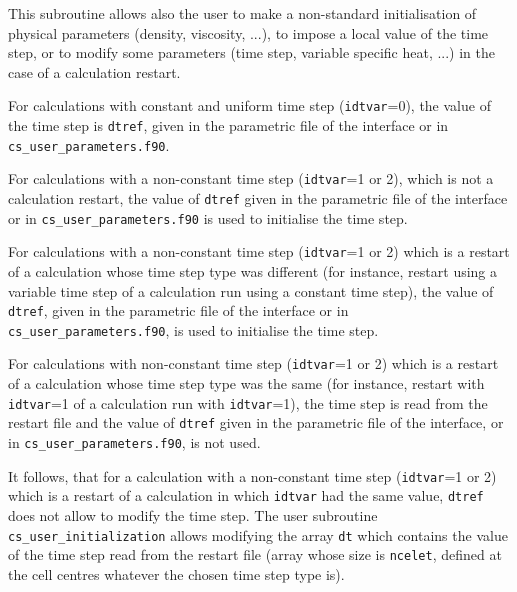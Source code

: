{{{This subroutine allows also the user to make a non-standard initialisation of
physical parameters (density, viscosity, ...), to impose a local
value of the time step, or to modify some parameters (time step,
variable specific heat, ...) in the case of a calculation restart.

\begin{list}{-}{}
\item For calculations with constant and uniform time step
      (\texttt{idtvar}=0), the value of the time step is \texttt{dtref},
      given in the parametric file of the interface or in
      \texttt{cs\_user\_parameters.f90}.
\item For calculations with a non-constant time step
      (\texttt{idtvar}=1 or 2), which is not a calculation restart,
      the value of \texttt{dtref} given in the parametric file of the interface
      or in \texttt{cs\_user\_parameters.f90} is used to initialise the time
      step.
\item For calculations with a non-constant time step
      (\texttt{idtvar}=1 or 2) which is a restart of a
      calculation whose time step type was different (for instance, restart
      using a variable time step of a calculation run using a constant time
      step), the value of \texttt{dtref}, given in the parametric file of the
      interface or in \texttt{cs\_user\_parameters.f90}, is used to initialise
      the time step.
\item For calculations with non-constant time step
      (\texttt{idtvar}=1 or 2) which is a restart of a
      calculation whose time step type was the same (for instance, restart with
      \texttt{idtvar}=1 of a calculation run with \texttt{idtvar}=1), the time
      step is read from the restart file and the value of \texttt{dtref} given
      in the parametric file of the interface, or in
      \texttt{cs\_user\_parameters.f90}, is not used.
\end{list}
It follows, that for a calculation with a non-constant time step
(\texttt{idtvar}=1 or 2) which is a restart of a calculation in which
\texttt{idtvar} had the same value, \texttt{dtref} does not allow to modify the
time step. The user subroutine \texttt{cs\_user\_initialization} allows
modifying the array \texttt{dt} which contains the value of the time step read
from the restart file (array whose size is \texttt{ncelet}, defined at the cell
centres whatever the chosen time step type is).

}}}
